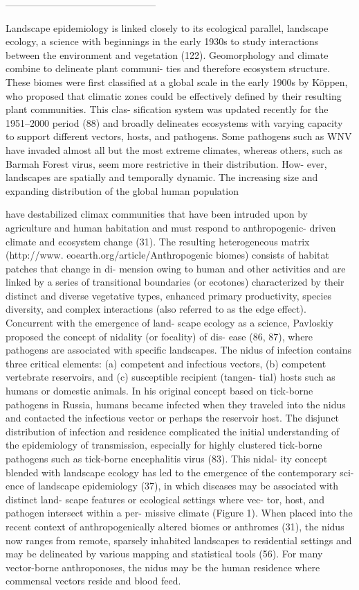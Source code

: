 -----------------------------------------------

Landscape epidemiology is linked closely
to its ecological parallel, landscape ecology, a
science with beginnings in the early 1930s to
study interactions between the environment
and vegetation (122). Geomorphology and
climate combine to delineate plant communi-
ties and therefore ecosystem structure. These
biomes were first classified at a global scale in
the early 1900s by Köppen, who proposed that
climatic zones could be effectively defined by
their resulting plant communities. This clas-
sification system was updated recently for the
1951–2000 period (88) and broadly delineates
ecosystems with varying capacity to support
different vectors, hosts, and pathogens. Some
pathogens such as WNV have invaded almost
all but the most extreme climates, whereas
others, such as Barmah Forest virus, seem
more restrictive in their distribution. How-
ever, landscapes are spatially and temporally
dynamic. The increasing size and expanding
distribution of the global human population


have destabilized climax communities that have
been intruded upon by agriculture and human
habitation and must respond to anthropogenic-
driven climate and ecosystem change (31). The
resulting heterogeneous matrix (http://www.
eoearth.org/article/Anthropogenic biomes)
consists of habitat patches that change in di-
mension owing to human and other activities
and are linked by a series of transitional
boundaries (or ecotones) characterized by their
distinct and diverse vegetative types, enhanced
primary productivity, species diversity, and
complex interactions (also referred to as the
edge effect).
Concurrent with the emergence of land-
scape ecology as a science, Pavloskiy proposed
the concept of nidality (or focality) of dis-
ease (86, 87), where pathogens are associated
with specific landscapes. The nidus of infection
contains three critical elements: (a) competent
and infectious vectors, (b) competent vertebrate
reservoirs, and (c) susceptible recipient (tangen-
tial) hosts such as humans or domestic animals.
In his original concept based on tick-borne
pathogens in Russia, humans became infected
when they traveled into the nidus and contacted
the infectious vector or perhaps the reservoir
host. The disjunct distribution of infection and
residence complicated the initial understanding
of the epidemiology of transmission, especially
for highly clustered tick-borne pathogens such
as tick-borne encephalitis virus (83). This nidal-
ity concept blended with landscape ecology has
led to the emergence of the contemporary sci-
ence of landscape epidemiology (37), in which
diseases may be associated with distinct land-
scape features or ecological settings where vec-
tor, host, and pathogen intersect within a per-
missive climate (Figure 1). When placed into
the recent context of anthropogenically altered
biomes or anthromes (31), the nidus now ranges
from remote, sparsely inhabited landscapes to
residential settings and may be delineated by
various mapping and statistical tools (56). For
many vector-borne anthroponoses, the nidus
may be the human residence where commensal
vectors reside and blood feed.


